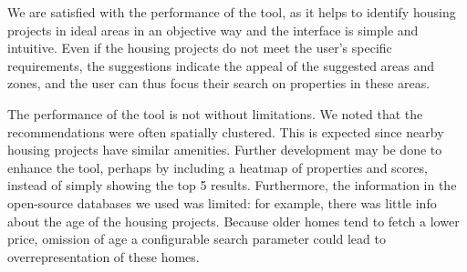 \documentclass[a4paper, 11pt]{article}
\begin{document}
We are satisfied with the performance of the tool, as it helps to identify housing projects in ideal areas in an objective way and the interface is simple and intuitive. Even if the housing projects do not meet the user’s specific requirements, the suggestions indicate the appeal of the suggested areas and zones, and the user can thus focus their search on properties in these areas. 

The performance of the tool is not without limitations. We noted that the recommendations were often spatially clustered. This is expected since nearby housing projects have similar amenities. Further development may be done to enhance the tool, perhaps by including a heatmap of properties and scores, instead of simply showing the top 5 results. Furthermore, the information in the open-source databases we used was limited: for example, there was little info about the age of the housing projects. Because older homes tend to fetch a lower price, omission of age a configurable search parameter could lead to overrepresentation of these homes.
\end{document}

